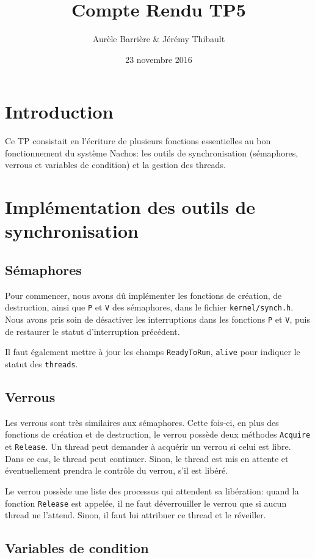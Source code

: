 \documentclass{article}
\title{Compte Rendu TP5}
\author{Aurèle Barrière \& Jérémy Thibault}
\date{23 novembre 2016}
\def\file#1{\texttt{#1}}
\def\fun#1{\texttt{#1}}
\def\obj#1{\texttt{#1}}
\begin{document}
\maketitle

\section*{Introduction}

Ce TP consistait en l'écriture de plusieurs fonctions essentielles au bon fonctionnement du système Nachos: les outils de synchronisation (sémaphores, verrous et variables de condition) et la gestion des threads.

\section{Implémentation des outils de synchronisation}
\subsection{Sémaphores}

  Pour commencer, nous avons dû implémenter les fonctions de création, de destruction, ainsi que \fun{P} et \fun{V} des sémaphores, dans le fichier \file{kernel/synch.h}. Nous avons pris soin de désactiver les interruptions dans les fonctions \fun{P} et \fun{V}, puis de restaurer le statut d'interruption précédent.

  Il faut également mettre à jour les champs \obj{ReadyToRun}, \obj{alive} pour indiquer le statut des \obj{threads}.

\subsection{Verrous}

  Les verrous sont très similaires aux sémaphores. Cette fois-ci, en plus des fonctions de création et de destruction, le verrou possède deux méthodes \fun{Acquire} et \fun{Release}. Un thread peut demander à acquérir un verrou si celui est libre. Dans ce cas, le thread peut continuer. Sinon, le thread est mis en attente et éventuellement prendra le contrôle du verrou, s'il est libéré. %

  Le verrou possède une liste des processus qui attendent sa libération: quand la fonction \fun{Release} est appelée, il ne faut déverrouiller le verrou que si aucun thread ne l'attend. Sinon, il faut lui attribuer ce thread et le réveiller.

\subsection{Variables de condition}
\end{document}
